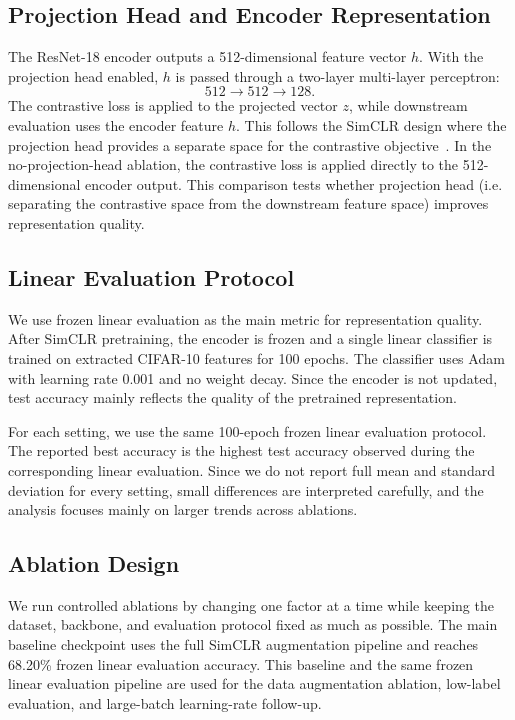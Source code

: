 \documentclass[10pt]{article}
\begin{document}
\subsection{Projection Head and Encoder Representation}

The ResNet-18 encoder outputs a 512-dimensional feature vector $h$. With the projection head enabled, $h$ is passed through a two-layer multi-layer perceptron:
\[
512 \rightarrow 512 \rightarrow 128.
\]
The contrastive loss is applied to the projected vector $z$, while downstream evaluation uses the encoder feature $h$. This follows the SimCLR design where the projection head provides a separate space for the contrastive objective~\cite{simclr}. In the no-projection-head ablation, the contrastive loss is applied directly to the 512-dimensional encoder output. This comparison tests whether projection head (i.e. separating the contrastive space from the downstream feature space) improves representation quality.

\subsection{Linear Evaluation Protocol}

We use frozen linear evaluation as the main metric for representation quality. After SimCLR pretraining, the encoder is frozen and a single linear classifier is trained on extracted CIFAR-10 features for 100 epochs. The classifier uses Adam with learning rate 0.001 and no weight decay. Since the encoder is not updated, test accuracy mainly reflects the quality of the pretrained representation.

For each setting, we use the same 100-epoch frozen linear evaluation protocol. The reported best accuracy is the highest test accuracy observed during the corresponding linear evaluation. Since we do not report full mean and standard deviation for every setting, small differences are interpreted carefully, and the analysis focuses mainly on larger trends across ablations.

\subsection{Ablation Design}

We run controlled ablations by changing one factor at a time while keeping the dataset, backbone, and evaluation protocol fixed as much as possible. The main baseline checkpoint uses the full SimCLR augmentation pipeline and reaches 68.20\% frozen linear evaluation accuracy. This baseline and the same frozen linear evaluation pipeline are used for the data augmentation ablation, low-label evaluation, and large-batch learning-rate follow-up.
\end{document}
